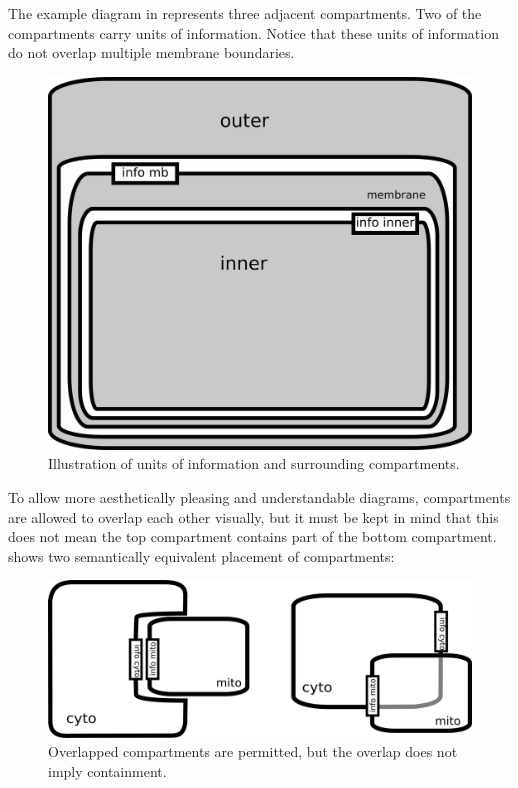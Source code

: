 The example diagram in  represents three adjacent compartments.  Two of the compartments carry units of information.  Notice that these units of information do not overlap multiple membrane boundaries.

\begin{figure}[H]
  \centering
  \includegraphics[scale = 0.4]{examples/compartment-3comp.png}
  \caption{Illustration of units of information and surrounding compartments.}
  \label{fig:three-comp}
\end{figure}

To allow more aesthetically pleasing and understandable diagrams, compartments are allowed to overlap each other visually, but it must be kept in mind that this does not mean the top compartment contains part of the bottom compartment.   shows two semantically equivalent placement of compartments:

\begin{figure}[H]
  \centering
  \includegraphics[scale = 0.4]{examples/compartment_overlapping.png}
  \caption{Overlapped compartments are permitted, but the overlap does not imply containment.}
  \label{fig:overlap}
\end{figure}

